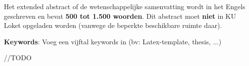 Het extended abstract of de wetenschappelijke samenvatting wordt in het Engels geschreven en bevat {\bf 500 tot 1.500 woorden}. Dit abstract moet {\bf niet} in KU Loket opgeladen worden (vanwege de beperkte beschikbare ruimte daar).

\textbf{Keywords}: Voeg een vijftal keywords in (bv: Latex-template, thesis, ...)

//TODO